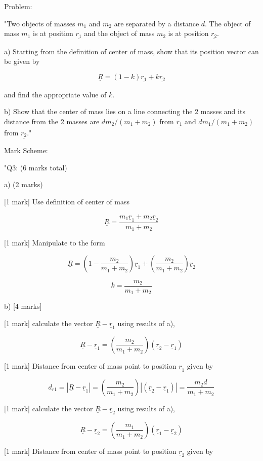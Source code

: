 Problem: 

"Two objects of masses \( m_{1} \) and \( m_{2} \) are separated by a distance \( d \). The object of mass \( m_{1} \) is at position \( \underline{r_{1}} \) and the object of mass \( m_{2} \) is at position \( \underline{r_{2}} \).

a) Starting from the definition of center of mass, show that its position vector can be given by 

\[ \underline{R} = (1-k)\underline{r_{1}} + k\underline{r_{2}} \]

and find the appropriate value of \( k \). 

b) Show that the center of mass lies on a line connecting the 2 masses and its distance from the 2 masses are \( d m_{2}/(m_{1}+m_{2}) \) from \( \underline{r_{1}} \) and \( d m_{1}/(m_{1}+m_{2}) \) from \( \underline{r_{2}} \)."

Mark Scheme:

"{Q3: (6 marks total)}

a) (2 marks) 

[1 mark] Use definition of center of mass 

\[ \underline{R} = \frac{m_1 \underline{r}_1 + m_2 \underline{r}_2}{m_1 + m_2} \]

[1 mark] Manipulate to the form 

\[ \underline{R} = \left ( 1 - \frac{m_2}{m_1 + m_2} \right ) \underline{r}_1 + \left ( \frac{m_2}{m_1 + m_2} \right ) \underline{r}_2 \]

\[ k = \frac{m_2}{m_1 + m_2} \]

b) [4 marks] 

[1 mark] calculate the vector \( \underline{R} - \underline{r}_1 \) using results of a), 

\[ \underline{R} - \underline{r}_1 = \left( \frac{m_2}{m_1+m_2} \right )(\underline{r}_2 - \underline{r}_1) \]

[1 mark] Distance from center of mass point to position \( \underline{r}_1 \) given by 

\[ d_{r1} = | \underline{R} - \underline{r}_1 | = \left( \frac{m_2}{m_1+m_2} \right )|(\underline{r}_2 - \underline{r}_1) | = \frac{m_2 d}{m_1+m_2} \]

[1 mark] calculate the vector \( \underline{R} - \underline{r}_2 \) using results of a), 

\[ \underline{R} - \underline{r}_2 = \left( \frac{m_1}{m_1+m_2} \right )(\underline{r}_1 - \underline{r}_2) \]

[1 mark] Distance from center of mass point to position \( \underline{r}_2 \) given by 

